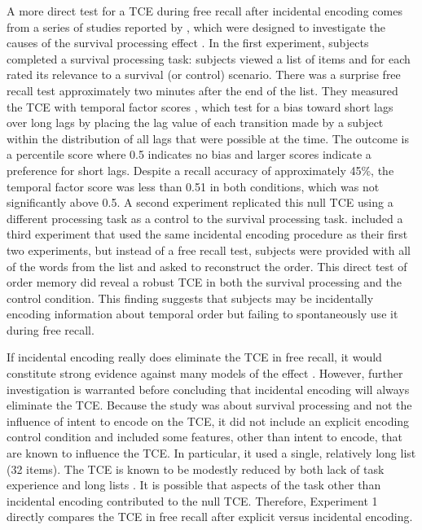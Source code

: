 \documentclass[man,natbib,floatsintext]{apa6} %
\begin{document}
A more direct test for a TCE during free recall after incidental encoding comes from a series of studies reported by \citet{NairEtal17}, which were designed to investigate the causes of the survival processing effect \citep{NairEtal07}. In the first experiment, subjects completed a survival processing task: subjects viewed a list of items and for each rated its relevance to a survival (or control) scenario. There was a surprise free recall test approximately two minutes after the end of the list. They measured the TCE with temporal factor scores \citep{PolyEtal09}, which test for a bias toward short lags over long lags by placing the lag value of each transition made by a subject within the distribution of all lags that were possible at the time. The outcome is a percentile score where 0.5 indicates no bias and larger scores indicate a preference for short lags. Despite a recall accuracy of approximately 45\%, the temporal factor score was less than 0.51 in both conditions, which was not significantly above 0.5. A second experiment replicated this null TCE using a different processing task as a control to the survival processing task. \citet{NairEtal17} included a third experiment that used the same incidental encoding procedure as their first two experiments, but instead of a free recall test, subjects were provided with all of the words from the list and asked to reconstruct the order. This direct test of order memory did reveal a robust TCE in both the survival processing and the control condition. This finding suggests that subjects may be incidentally encoding information about temporal order but failing to spontaneously use it during free recall.

If incidental encoding really does eliminate the TCE in free recall, it would constitute strong evidence against many models of the effect \citep[e.g.,][]{LohnEtal14,HealKaha17}. However, further investigation is warranted before concluding that incidental encoding will always eliminate the TCE. Because the \citet{NairEtal17} study was about survival processing and not the influence of intent to encode on the TCE, it did not include an explicit encoding control condition and included some features, other than intent to encode, that are known to influence the TCE. In particular, it used a single, relatively long list (32 items). The TCE is known to be modestly reduced by both lack of task experience and long lists \citep{HealKaha17}. It is possible that aspects of the task other than incidental encoding contributed to the null TCE. Therefore, Experiment 1 directly compares the TCE in free recall after explicit versus incidental encoding.
\end{document}

